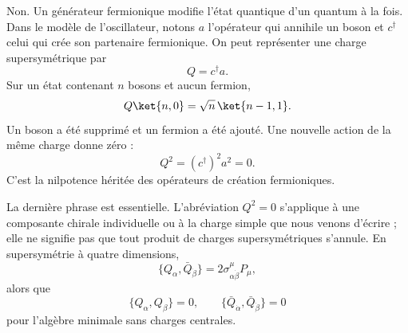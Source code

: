 Non. Un générateur fermionique modifie l’état quantique d’un quantum à la fois. Dans le modèle de l’oscillateur, notons \(a\) l’opérateur qui annihile un boson et \(c^\dagger\) celui qui crée son partenaire fermionique. On peut représenter une charge supersymétrique par
\begin{equation}
Q=c^\dagger a.
\end{equation}
Sur un état contenant \(n\) bosons et aucun fermion,
\begin{equation}
Q\ket{n,0}
=\sqrt n\,\ket{n-1,1}.
\end{equation}
Un boson a été supprimé et un fermion a été ajouté. Une nouvelle action de la même charge donne zéro :
\begin{equation}
Q^2=(c^\dagger)^2a^2=0.
\end{equation}
C’est la nilpotence héritée des opérateurs de création fermioniques.

\begin{classroomqa}
\end{classroomqa}

La dernière phrase est essentielle. L’abréviation \(Q^2=0\) s’applique à une composante chirale individuelle ou à la charge simple que nous venons d’écrire ; elle ne signifie pas que tout produit de charges supersymétriques s’annule. En supersymétrie à quatre dimensions,
\begin{equation}
\{Q_\alpha,\bar Q_{\dot\beta}\}
=2\sigma^\mu_{\alpha\dot\beta}P_\mu,
\end{equation}
alors que
\begin{equation}
\{Q_\alpha,Q_\beta\}=0,
\qquad
\{\bar Q_{\dot\alpha},\bar Q_{\dot\beta}\}=0
\end{equation}
pour l’algèbre minimale sans charges centrales.

